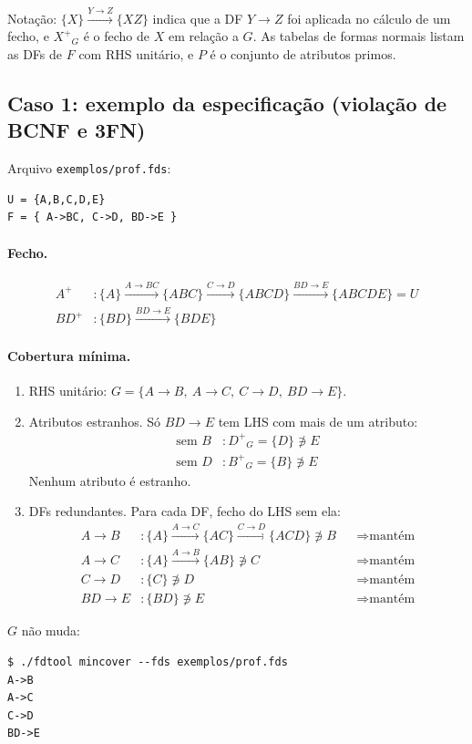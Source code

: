 \documentclass[11pt,a4paper]{article}
\newcommand{\fd}[2]{\ensuremath{#1 \to #2}}
\newcommand{\cl}[1]{\ensuremath{#1^{+}}}
\newcommand{\via}[1]{\xrightarrow{#1}}
\begin{document}
Notação: $\{X\} \via{\fd{Y}{Z}} \{XZ\}$ indica que a DF \fd{Y}{Z} foi
aplicada no cálculo de um fecho, e $\cl{X}_{G}$ é o fecho de $X$ em relação
a $G$. As tabelas de formas normais listam as DFs de $F$ com RHS unitário, e
$P$ é o conjunto de atributos primos.

\subsection{Caso 1: exemplo da especificação (violação de BCNF e 3FN)}
\label{sec:caso1}

Arquivo \texttt{exemplos/prof.fds}:
\begin{verbatim}
U = {A,B,C,D,E}
F = { A->BC, C->D, BD->E }
\end{verbatim}

\paragraph{Fecho.}
\begin{align*}
    \cl{A}  &: \{A\} \via{\fd{A}{BC}} \{ABC\} \via{\fd{C}{D}} \{ABCD\}
    \via{\fd{BD}{E}} \{ABCDE\} = U \\
    \cl{BD} &: \{BD\} \via{\fd{BD}{E}} \{BDE\}
\end{align*}

\paragraph{Cobertura mínima.}
\begin{enumerate}
    \item RHS unitário:
        $G = \{\fd{A}{B},\ \fd{A}{C},\ \fd{C}{D},\ \fd{BD}{E}\}$.

    \item Atributos estranhos. Só \fd{BD}{E} tem LHS com mais de um atributo:
        \begin{align*}
            \text{sem } B &: \cl{D}_{G} = \{D\} \not\ni E \\
            \text{sem } D &: \cl{B}_{G} = \{B\} \not\ni E
        \end{align*}
        Nenhum atributo é estranho.

    \item DFs redundantes. Para cada DF, fecho do LHS sem ela:
        \begin{align*}
            \fd{A}{B}  &: \{A\} \via{\fd{A}{C}} \{AC\} \via{\fd{C}{D}} \{ACD\} \not\ni B
            &&\Rightarrow \text{mantém} \\
            \fd{A}{C}  &: \{A\} \via{\fd{A}{B}} \{AB\} \not\ni C
            &&\Rightarrow \text{mantém} \\
            \fd{C}{D}  &: \{C\} \not\ni D
            &&\Rightarrow \text{mantém} \\
            \fd{BD}{E} &: \{BD\} \not\ni E
            &&\Rightarrow \text{mantém}
        \end{align*}
\end{enumerate}
$G$ não muda:
\begin{verbatim}
$ ./fdtool mincover --fds exemplos/prof.fds
A->B
A->C
C->D
BD->E
\end{verbatim}
\end{document}
